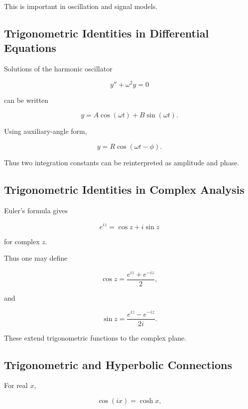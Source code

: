 This is important in oscillation and signal models.

\subsection{Trigonometric Identities in Differential Equations}
\label{subsec:trig-identities-differential-equations}

Solutions of the harmonic oscillator

\[
y''+\omega^2y=0
\]

can be written

\[
\boxed{
y
=
A\cos(\omega t)
+
B\sin(\omega t).
}
\]

Using auxiliary-angle form,

\[
\boxed{
y
=
R\cos(\omega t-\phi).
}
\]

Thus two integration constants can be reinterpreted as amplitude and phase.

\subsection{Trigonometric Identities in Complex Analysis}
\label{subsec:trig-identities-complex-analysis}

Euler's formula gives

\[
e^{iz}
=
\cos z+i\sin z
\]

for complex \(z\).

Thus one may define

\[
\boxed{
\cos z
=
\frac{
e^{iz}+e^{-iz}
}{2},
}
\]

and

\[
\boxed{
\sin z
=
\frac{
e^{iz}-e^{-iz}
}{
2i
}.
}
\]

These extend trigonometric functions to the complex plane.

\subsection{Trigonometric and Hyperbolic Connections}
\label{subsec:trig-hyperbolic-connections}

For real \(x\),

\[
\boxed{
\cos(ix)
=
\cosh x,
}
\]

